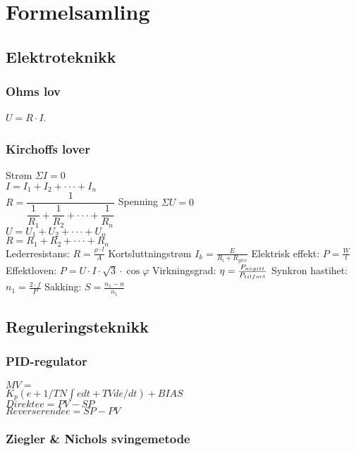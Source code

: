 
\section{Formelsamling}

\subsection{Elektroteknikk}
\vskip 2.5pt
\subsubsection*{Ohms lov}
\vskip 2.5pt
$U=R\cdot I$.
\vskip 2.5pt
\subsubsection*{Kirchoffs lover}
\vskip 2.5pt  
Strøm $\Sigma I=0$\\
\vskip 2.5pt  
$I=I_{1}+I_{2}+\cdot\cdot\cdot+I_{n}$\\
\vskip 2.5pt  
$R=\dfrac{1}{\dfrac{1}{R_{1}}+\dfrac{1}{R_{2}}+\cdot\cdot\cdot+\dfrac{1}{R_{n}}}$
\vskip 2pt
 Spenning $\Sigma U=0$\\
\vskip 2.5pt  
$U=U_{1}+U_{2}+\cdot\cdot\cdot+U_{n}$\\
\vskip 2.5pt  
$R=R_{1}+R_{2}+\cdot\cdot\cdot+R_{n}$\\
\vskip 2pt
Lederresistans: $ R=\frac{\rho\cdot l}{A}$ 
\vskip 2pt
Kortsluttningstrøm $I_{k}=\frac{E}{R_{i}+R_{ytre}}$
\vskip 2pt
Elektrisk effekt: $P=\frac{W}{t}$
\vskip 2pt  
Effektloven: $P=U\cdot I\cdot \sqrt{3} \cdot \cos \varphi$
\vskip 2.5pt  
Virkningsgrad: $\eta=\frac{P_{avgitt}}{P_{tilf\\ort}}$
\vskip 2.5pt
Synkron hastihet: $n_1=\frac{2\cdot f}{P}$
\vskip 2.5pt 
Sakking: $S=\frac{n_1-n}{n_1}$
\vskip 2.5pt 
\subsection{Reguleringsteknikk}
\vskip 2.5pt 
\subsubsection*{PID-regulator}
$MV=$\\
$K_p(e+1/TN \int e dt + TV de/dt)+BIAS$\\
\vskip 2.5pt
$Direkte e=PV-SP$\\
$Reverserende e=SP-PV$\\
\subsubsection*{Ziegler \& Nichols svingemetode}
